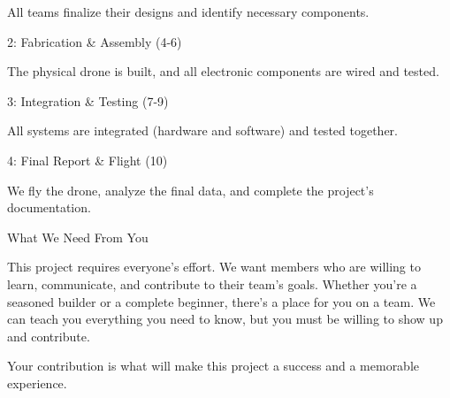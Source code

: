 \documentclass[11pt,letterpaper]{article}
\begin{document}
All teams finalize their designs and identify necessary components.\par

2: Fabrication \& Assembly (4-6)\par

The physical drone is built, and all electronic components are wired and tested.\par

3: Integration \& Testing (7-9)\par

All systems are integrated (hardware and software) and tested together.\par

4: Final Report \& Flight (10)\par

We fly the drone, analyze the final data, and complete the project's documentation.\par

What We Need From You\par

This project requires everyone's effort. We want members who are willing to learn, communicate, and contribute to their team's goals. Whether you're a seasoned builder or a complete beginner, there's a place for you on a team. We can teach you everything you need to know, but you must be willing to show up and contribute.\par

Your contribution is what will make this project a success and a memorable experience.\par
\end{document}
